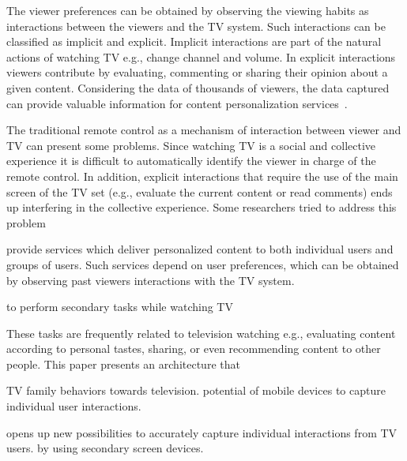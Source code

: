\documentclass[conference,a4paper]{IEEEtran}
\begin{document}
The viewer preferences can be obtained by observing the viewing habits as interactions between the viewers and the TV system. Such interactions can be classified as implicit and explicit. Implicit interactions are part of the natural actions of watching TV e.g., change channel and volume. In explicit interactions viewers contribute by evaluating, commenting or sharing their opinion about a given content. Considering the data of thousands of viewers, the data captured can provide valuable information for content personalization services~\cite{Teixeira2010}.

The traditional remote control as a mechanism of interaction between viewer and TV can present some problems. Since watching TV is a social and collective experience it is difficult to automatically identify the viewer in charge of the remote control. In addition, explicit interactions that require the use of the main screen of the TV set (e.g., evaluate the current content or read comments) ends up interfering in the collective experience. Some researchers tried to address this problem

provide services which deliver personalized content to both individual users and groups of users. Such services depend on user preferences, which can be obtained by observing past viewers interactions with the TV system.



to perform secondary tasks while watching TV

These tasks are frequently related to television watching e.g., evaluating content according to personal tastes, sharing, or even recommending content to other people. This paper presents an architecture that 

TV family behaviors towards television.
potential of mobile devices to capture individual user interactions.

opens up new possibilities to accurately capture individual interactions from TV users. by using secondary screen devices.




\end{document}

